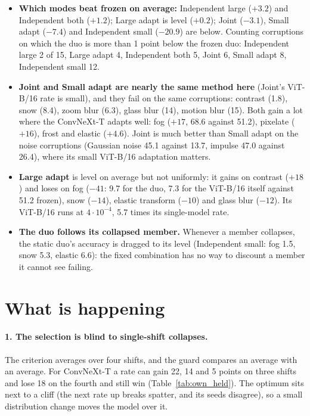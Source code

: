 \documentclass[10pt]{article}
\newcommand{\vit}{ViT-B/16}
\newcommand{\cnx}{ConvNeXt-T}
\begin{document}
\begin{table}[H]
  \centering\small
  \caption{The duo's accuracy (\%) on each of the 15 test corruptions under every mode (mean over 3 seeds). Red: more than 5 points below the frozen duo.}
  \label{tab:test_corr}
  
\end{table}

\begin{itemize}
  \item \textbf{Which modes beat frozen on average:} Independent large (\(+3.2\)) and Independent both (\(+1.2\)); Large adapt is level (\(+0.2\)); Joint (\(-3.1\)), Small adapt (\(-7.4\)) and Independent small (\(-20.9\)) are below. Counting corruptions on which the duo is more than 1 point below the frozen duo: Independent large 2 of 15, Large adapt 4, Independent both 5, Joint 6, Small adapt 8, Independent small 12.
  \item \textbf{Joint and Small adapt are nearly the same method here} (Joint's \vit{} rate is small), and they fail on the same corruptions: contrast (1.8), snow (8.4), zoom blur (6.3), glass blur (14), motion blur (15). Both gain a lot where the \cnx{} adapts well: fog (\(+17\), 68.6 against 51.2), pixelate (\(+16\)), frost and elastic (\(+4.6\)). Joint is much better than Small adapt on the noise corruptions (Gaussian noise 45.1 against 13.7, impulse 47.0 against 26.4), where its small \vit{} adaptation matters.
  \item \textbf{Large adapt} is level on average but not uniformly: it gains on contrast (\(+18\)) and loses on fog (\(-41\): 9.7 for the duo, 7.3 for the \vit{} itself against 51.2 frozen), snow (\(-14\)), elastic transform (\(-10\)) and glass blur (\(-12\)). Its \vit{} runs at \(4{\cdot}10^{-4}\), 5.7 times its single-model rate.
  \item \textbf{The duo follows its collapsed member.} Whenever a member collapses, the static duo's accuracy is dragged to its level (Independent small: fog 1.5, snow 5.3, elastic 6.6): the fixed combination has no way to discount a member it cannot see failing.
\end{itemize}

\section{What is happening}\label{sec:what}
\paragraph{1. The selection is blind to single-shift collapses.} The criterion averages over four shifts, and the guard compares an average with an average. For \cnx{} a rate can gain 22, 14 and 5 points on three shifts and lose 18 on the fourth and still win (Table~\ref{tab:own_held}). The optimum sits next to a cliff (the next rate up breaks spatter, and its seeds disagree), so a small distribution change moves the model over it.
\end{document}
